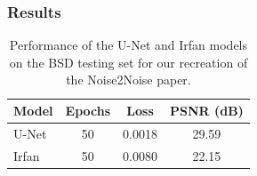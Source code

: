 \subsubsection{Results}


\begin{table}[htbp] 
\centering 
\caption{Performance of the U-Net and Irfan models on the BSD testing set for our recreation of the Noise2Noise paper.} 
\label{tab:n2n-imagenet-results} 
    \begin{tabular}{lccc} 
    \toprule 
    \textbf{Model} & \textbf{Epochs} & \textbf{Loss} & \textbf{PSNR (dB)}\\ \midrule 
    U-Net & 50 & 0.0018 & 29.59 \\ 
    Irfan & 50 & 0.0080 & 22.15 \\ \bottomrule 
    \end{tabular} 
\end{table}


